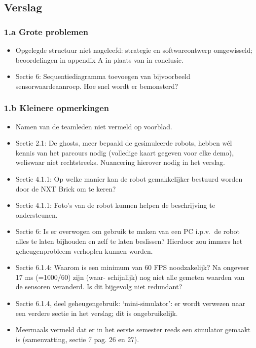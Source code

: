\documentclass[12pt,a4paper]{report}
\begin{document}
\subsection{ Verslag} 
     
     \subsubsection{1.a Grote problemen}

\begin{itemize}
	\item    Opgelegde structuur niet nageleefd: strategie en softwareontwerp omgewisseld;
 beoordelingen in appendix A in plaats van in conclusie.
\item Sectie 6: Sequentiediagramma toevoegen van bijvoorbeeld sensorwaardeaanroep. Hoe snel wordt er bemonsterd?
\end{itemize}

   \subsubsection{1.b Kleinere opmerkingen}

 
\begin{itemize}
 \item Namen van de teamleden niet vermeld op voorblad.
 \item Sectie 2.1: De ghosts, meer bepaald de gesimuleerde robots, hebben w\'el kennis van het parcours nodig (volledige
kaart gegeven voor elke demo), weliswaar niet rechtstreeks. Nuancering hierover nodig in het verslag.
 \item Sectie 4.1.1: Op welke manier kan de robot gemakkelijker bestuurd worden door de NXT Brick om te keren?
 \item Sectie 4.1.1: Foto's van de robot kunnen helpen de beschrijving te ondersteunen.
 \item Sectie 6: Is er overwogen om gebruik te maken van een PC i.p.v.\ de robot alles te laten bijhouden en zelf te
laten beslissen? Hierdoor zou immers het geheugenprobleem verhoplen kunnen worden.
 \item Sectie 6.1.4: Waarom is een minimum van 60 FPS noodzakelijk? Na ongeveer 17 ms (=1000/60) zijn (waar-
schijnlijk) nog niet alle gemeten waarden van de sensoren veranderd. Is dit bijgevolg niet redundant?
\item Sectie 6.1.4, deel geheugengebruik: `mini-simulator': er wordt verwezen naar een verdere sectie in het verslag;
dit is ongebruikelijk.
\item Meermaals vermeld dat er in het eerste semester reeds een simulator gemaakt is (samenvatting, sectie 7 pag. 26
en 27).
\end{itemize}
\end{document}
